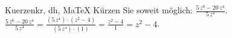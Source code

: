 \begin{MAufgabe}{Kuerzen}{kr, dh, MaTeX}
K\"urzen Sie soweit m\"oglich: $\frac{5\, z^6 - 20\, z^4}{5\, z^4}$.\\ 
\ifLsg\MLoesung
\quad $\frac{5\, z^6 - 20\, z^4}{5\, z^4}=\frac{(5\, z^4)\cdot(z^2 - 4)}{(5\, z^4)\cdot(1)}=\frac{z^2 - 4}{1}=z^2 - 4$.\else\relax\fi
 \end{MAufgabe}